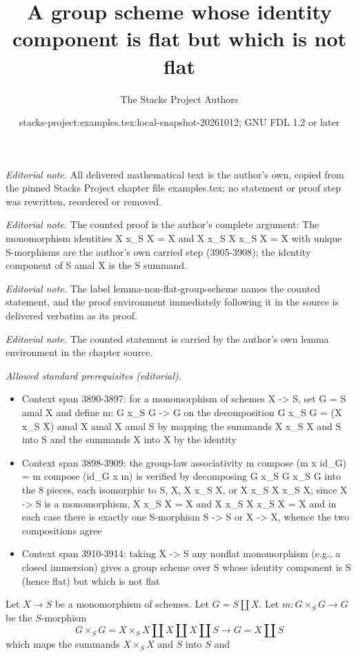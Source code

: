 \documentclass[10pt,a4paper]{amsart}
\title{A group scheme whose identity component is flat but which is not flat}
\author{The Stacks Project Authors}
\date{stacks-project:examples.tex:local-snapshot-20261012; GNU FDL 1.2 or later}
\theoremstyle{plain}
\theoremstyle{definition}
\theoremstyle{remark}
\numberwithin{equation}{subsection}
\begin{document}
\maketitle
\noindent\textit{Editorial note.} All delivered mathematical text is the author's own, copied from the pinned Stacks Project chapter file examples.tex; no statement or proof step was rewritten, reordered or removed.\par\medskip
\noindent\textit{Editorial note.} The counted proof is the author's complete argument: The monomorphism identities X x\_S X = X and X x\_S X x\_S X = X with unique S-morphisms are the author's own carried step (3905-3908); the identity component of S amal X is the S summand.\par\medskip
\noindent\textit{Editorial note.} The label lemma-non-flat-group-scheme names the counted statement, and the proof environment immediately following it in the source is delivered verbatim as its proof.\par\medskip
\noindent\textit{Editorial note.} The counted statement is carried by the author's own lemma environment in the chapter source.\par\medskip
\noindent\textit{Allowed standard prerequisites (editorial).}\begin{itemize}
\item Context span 3890-3897: for a monomorphism of schemes X -> S, set G = S amal X and define m: G x\_S G -> G on the decomposition G x\_S G = (X x\_S X) amal X amal X amal S by mapping the summands X x\_S X and S into S and the summands X into X by the identity
\item Context span 3898-3909: the group-law associativity m compose (m x id\_G) = m compose (id\_G x m) is verified by decomposing G x\_S G x\_S G into the 8 pieces, each isomorphic to S, X, X x\_S X, or X x\_S X x\_S X; since X -> S is a monomorphism, X x\_S X = X and X x\_S X x\_S X = X and in each case there is exactly one S-morphism S -> S or X -> X, whence the two compositions agree
\item Context span 3910-3914: taking X -> S any nonflat monomorphism (e.g., a closed immersion) gives a group scheme over S whose identity component is S (hence flat) but which is not flat
\end{itemize}\medskip
Let $X \to S$ be a monomorphism of schemes. Let $G = S \amalg X$.
Let $m : G \times_S G \to G$ be the $S$-morphism
$$
G \times_S G = X \times_S X \amalg X \amalg X \amalg S
\longrightarrow G = X \amalg S
$$
which maps the summands $X \times_S X$ and $S$ into $S$ and
\end{document}
